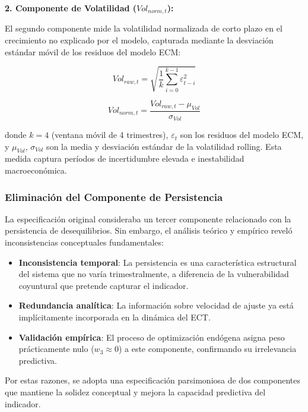 \documentclass[3p,11pt]{elsarticle}
\begin{document}
\textbf{2. Componente de Volatilidad ($Vol_{norm,t}$):}

El segundo componente mide la volatilidad normalizada de corto plazo en el crecimiento no explicado por el modelo, capturada mediante la desviación estándar móvil de los residuos del modelo ECM:

\begin{equation}
Vol_{raw,t} = \sqrt{\frac{1}{k} \sum_{i=0}^{k-1} \varepsilon_{t-i}^2}
\label{eq:volatilidad_raw}
\end{equation}

\begin{equation}
Vol_{norm,t} = \frac{Vol_{raw,t} - \mu_{Vol}}{\sigma_{Vol}}
\label{eq:volatilidad_norm}
\end{equation}

donde $k = 4$ (ventana móvil de 4 trimestres), $\varepsilon_t$ son los residuos del modelo ECM, y $\mu_{Vol}$, $\sigma_{Vol}$ son la media y desviación estándar de la volatilidad rolling. Esta medida captura períodos de incertidumbre elevada e inestabilidad macroeconómica.

\subsubsection{Eliminación del Componente de Persistencia}

La especificación original consideraba un tercer componente relacionado con la persistencia de desequilibrios. Sin embargo, el análisis teórico y empírico reveló inconsistencias conceptuales fundamentales:

\begin{itemize}
    \item \textbf{Inconsistencia temporal}: La persistencia es una característica estructural del sistema que no varía trimestralmente, a diferencia de la vulnerabilidad coyuntural que pretende capturar el indicador.
    \item \textbf{Redundancia analítica}: La información sobre velocidad de ajuste ya está implícitamente incorporada en la dinámica del ECT.
    \item \textbf{Validación empírica}: El proceso de optimización endógena asigna peso prácticamente nulo ($w_3 \approx 0$) a este componente, confirmando su irrelevancia predictiva.
\end{itemize}

Por estas razones, se adopta una especificación parsimoniosa de dos componentes que mantiene la solidez conceptual y mejora la capacidad predictiva del indicador.
\end{document}
